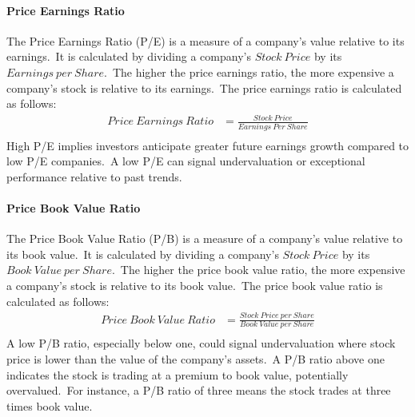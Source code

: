 \documentclass[../xlapes02]{subfiles}
\begin{document}
    \paragraph{Price Earnings Ratio}\label{par:price-earnings-ratio}
    The Price Earnings Ratio (P/E) is a measure of a company's value relative to its earnings.\ It is calculated by dividing a company's $Stock\ Price$ by its $Earnings\ per\ Share$.\ The higher the price earnings ratio, the more expensive a company's stock is relative to its earnings.\ The price earnings ratio is calculated as follows:
    \begin{equation}
        \label{eq:price-earnings-ratio}
        \begin{split}
            Price\ Earnings\ Ratio&=\frac{Stock\ Price}{Earnings\ Per\ Share}\\
        \end{split}
    \end{equation}
    High P/E implies investors anticipate greater future earnings growth compared to low P/E companies.\ A low P/E can signal undervaluation or exceptional performance relative to past trends.

    \paragraph{Price Book Value Ratio}\label{par:price-book-value-ratio}
    The Price Book Value Ratio (P/B) is a measure of a company's value relative to its book value.\ It is calculated by dividing a company's $Stock\ Price$ by its $Book\ Value\ per\ Share$.\ The higher the price book value ratio, the more expensive a company's stock is relative to its book value.\ The price book value ratio is calculated as follows:
    \begin{equation}
        \label{eq:price-book-value-ratio}
        \begin{split}
            Price\ Book\ Value\ Ratio&=\frac{Stock\ Price\ per\ Share}{Book\ Value\ per\ Share}\\
        \end{split}
    \end{equation}
    A low P/B ratio, especially below one, could signal undervaluation where stock price is lower than the value of the company's assets.\ A P/B ratio above one indicates the stock is trading at a premium to book value, potentially overvalued.\ For instance, a P/B ratio of three means the stock trades at three times book value.
\end{document}
